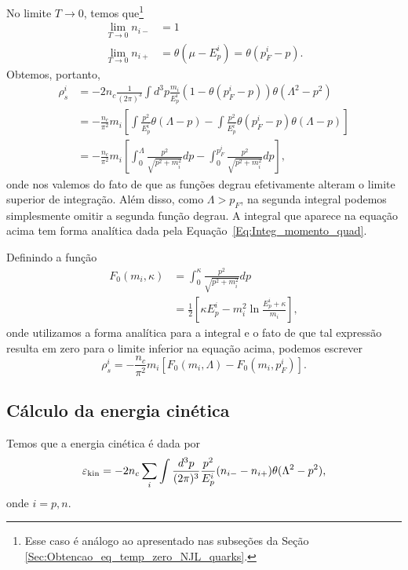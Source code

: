 No limite $T \to 0$, temos que\footnote{Esse caso é análogo ao apresentado nas subseções da Seção \ref{Sec:Obtencao_eq_temp_zero_NJL_quarks}.}
\begin{align}
	\lim_{T \to 0} n_{i-} &= 1 \\
	\lim_{T \to 0} n_{i+} &= \theta(\mu - E_p^i) = \theta(p_F^i - p).
\end{align}
%
Obtemos, portanto,
\begin{align}
	\rho_s^i &= - 2 n_c \frac{1}{(2\pi)^3} \int d^3p \frac{m_i}{E_p^i} (1 - \theta(p_F^i - p)) \theta(\Lambda^2 - p^2)\\
	&= -\frac{n_c}{\pi^2} m_i \left[\int \frac{p^2}{E_p^i} \theta(\Lambda - p) - \int \frac{p^2}{E_p^i}\theta(p_F^i - p)\theta(\Lambda - p)\right]\\
	&= -\frac{n_c}{\pi^2} m_i \left[\int_0^\Lambda \frac{p^2}{\sqrt{p^2+m_i^2}} dp - \int_0^{p_F^i} \frac{p^2}{\sqrt{p^2+m_i^2}} dp \right],
\end{align}
%
onde nos valemos do fato de que as funções degrau efetivamente alteram o limite superior de integração. Além disso, como $\Lambda > p_F$, na segunda integral podemos simplesmente omitir a segunda função degrau. A integral que aparece na equação acima tem forma analítica dada pela Equação~\ref{Eq:Integ_momento_quad}.

Definindo a função
\begin{align}
	F_0(m_i, \kappa) &= \int_0^\kappa \frac{p^2}{\sqrt{p^2 + m_i^2}} dp \\
	&= \frac{1}{2} \left[\kappa E_p^i - m_i^2\ln\frac{E_p^i + \kappa}{m_i} \right],
\end{align}
%
onde utilizamos a forma analítica para a integral e o fato de que tal expressão resulta em zero para o limite inferior na equação acima, podemos escrever
\begin{equation}
	\rho_s^i = -\frac{n_c}{\pi^2} m_i [F_0(m_i, \Lambda) - F_0(m_i,p_F^i)].
\end{equation}

\subsection{Cálculo da energia cinética}

Temos que a energia cinética é dada por
\begin{equation}
	\varepsilon_{\rm{kin}} = - 2 n_c \sum_i \int \frac{d^3p}{(2\pi)^3} \frac{p^2}{E_p^i} (n_{i-} - n_{i+}) \theta(\Lambda^2 - p^2),
\end{equation}
%
onde $i = p, n$.

